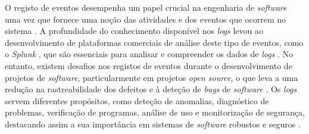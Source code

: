 O registo de eventos desempenha um papel crucial na engenharia de \textit{software} uma vez que 
fornece uma noção das atividades e dos eventos que ocorrem no sistema \cite{logs2022}. A profundidade 
do conhecimento disponível nos \textit{logs} levou ao desenvolvimento de plataformas comerciais de 
análise deste tipo de eventos, como o \textit{Splunk} \cite{splunk}, que são essenciais para 
analisar e compreender os dados de \textit{logs} \cite{logs2021}. No entanto, existem desafios nos 
registos de eventos durante o desenvolvimento de projetos de \textit{software}, particularmente em 
projetos \textit{open source}, o que leva a uma redução na rastreabilidade dos defeitos e à
deteção de \textit{bugs} de \textit{software} \cite{logs2018}. Os \textit{logs} servem diferentes 
propósitos, como deteção de anomalias, diagnóstico de problemas, verificação de programas, análise 
de uso e monitorização  de segurança, destacando assim a sua importância em sistemas de
\textit{software} robustos e seguros \cite{logs2019}.

